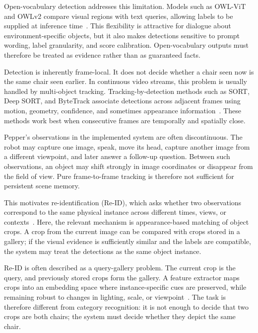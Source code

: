 Open-vocabulary detection addresses this limitation. Models such as OWL-ViT and OWLv2 compare visual regions with text queries, allowing labels to be supplied at inference time~\cite{minderer_simple_2022,minderer_scaling_2024}. This flexibility is attractive for dialogue about environment-specific objects, but it also makes detections sensitive to prompt wording, label granularity, and score calibration. Open-vocabulary outputs must therefore be treated as evidence rather than as guaranteed facts.

Detection is inherently frame-local. It does not decide whether a chair seen now is the same chair seen earlier. In continuous video streams, this problem is usually handled by multi-object tracking. Tracking-by-detection methods such as SORT, Deep SORT, and ByteTrack associate detections across adjacent frames using motion, geometry, confidence, and sometimes appearance information~\cite{bewley_simple_2016,wojke_simple_2017,zhang_bytetrack_2022}. These methods work best when consecutive frames are temporally and spatially close.

Pepper's observations in the implemented system are often discontinuous. The robot may capture one image, speak, move its head, capture another image from a different viewpoint, and later answer a follow-up question. Between such observations, an object may shift strongly in image coordinates or disappear from the field of view. Pure frame-to-frame tracking is therefore not sufficient for persistent scene memory.

This motivates re-identification (Re-ID), which asks whether two observations correspond to the same physical instance across different times, views, or contexts~\cite[22--23]{zheng_object_2024}. Here, the relevant mechanism is appearance-based matching of object crops. A crop from the current image can be compared with crops stored in a gallery; if the visual evidence is sufficiently similar and the labels are compatible, the system may treat the detections as the same object instance.

Re-ID is often described as a query-gallery problem. The current crop is the query, and previously stored crops form the gallery. A feature extractor maps crops into an embedding space where instance-specific cues are preserved, while remaining robust to changes in lighting, scale, or viewpoint~\cite[22]{zheng_object_2024}. The task is therefore different from category recognition: it is not enough to decide that two crops are both chairs; the system must decide whether they depict the same chair.

